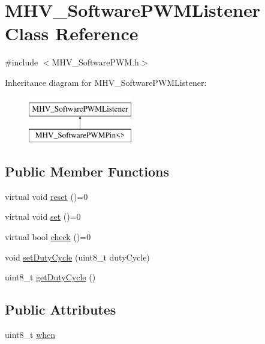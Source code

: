 \hypertarget{class_m_h_v___software_p_w_m_listener}{
\section{\-M\-H\-V\-\_\-\-Software\-P\-W\-M\-Listener \-Class \-Reference}
\label{class_m_h_v___software_p_w_m_listener}
}


{\ttfamily \#include $<$\-M\-H\-V\-\_\-\-Software\-P\-W\-M.\-h$>$}

\-Inheritance diagram for \-M\-H\-V\-\_\-\-Software\-P\-W\-M\-Listener\-:\begin{figure}[H]
\begin{center}
\leavevmode
\includegraphics[height=2.000000cm]{class_m_h_v___software_p_w_m_listener}
\end{center}
\end{figure}
\subsection*{\-Public \-Member \-Functions}
\begin{DoxyCompactItemize}
\item 
virtual void \hyperlink{class_m_h_v___software_p_w_m_listener_aa7b9a7ccf218ef0f07943d5867bcdd40}{reset} ()=0
\item 
virtual void \hyperlink{class_m_h_v___software_p_w_m_listener_a8aab80a3527516e82a6019a0574f30b2}{set} ()=0
\item 
virtual bool \hyperlink{class_m_h_v___software_p_w_m_listener_ab38928f4fef63d516046f492e9ef9b01}{check} ()=0
\item 
void \hyperlink{class_m_h_v___software_p_w_m_listener_aa9b9e22df8ac38895a05c09f4b15f0ae}{set\-Duty\-Cycle} (uint8\-\_\-t duty\-Cycle)
\item 
uint8\-\_\-t \hyperlink{class_m_h_v___software_p_w_m_listener_abb19231133f34d33dfcc1c9597f67c6d}{get\-Duty\-Cycle} ()
\end{DoxyCompactItemize}
\subsection*{\-Public \-Attributes}
\begin{DoxyCompactItemize}
\item 
uint8\-\_\-t \hyperlink{class_m_h_v___software_p_w_m_listener_ab3f5e55e2768e82057462c6af8514904}{when}
\end{DoxyCompactItemize}


